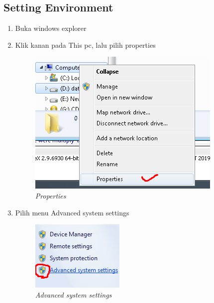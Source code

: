 \subsection{Setting Environment}
\begin{enumerate}
\item Buka windows explorer
\item Klik kanan pada This pc, lalu pilih properties
\begin{figure}[H]
    \centering
    \includegraphics[scale=0.7]{figures/a1}
    \caption{\textit{Properties}}
    \label{Environment1}
\end{figure}

\item Pilih menu Advanced system settings
\begin{figure}[H]
    \centering
    \includegraphics[scale=0.7]{figures/a2}
    \caption{\textit{Advanced system settings}}
    \label{Environment2}
\end{figure}


\end{enumerate}
